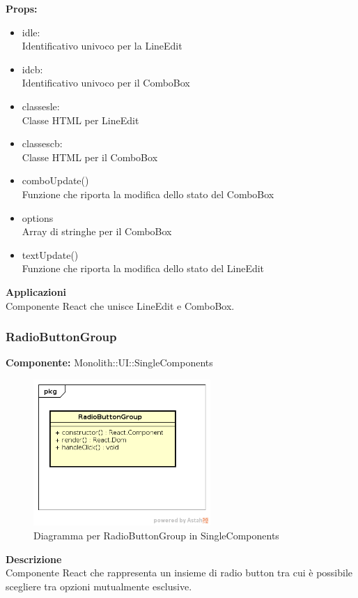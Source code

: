 \textbf{Props:} 
\begin{itemize}
\item idle: 
\\
Identificativo univoco per la LineEdit
\item idcb:
\\
Identificativo univoco per il ComboBox
\item classesle:
\\
Classe HTML per LineEdit
\item classescb: 
\\
Classe HTML per il ComboBox
\item comboUpdate()
\\
Funzione che riporta la modifica dello stato del ComboBox
\item options
\\
Array di stringhe per il ComboBox
\item textUpdate()
\\
Funzione che riporta la modifica dello stato del LineEdit
\end{itemize} 


\textbf{Applicazioni}\\
Componente React che unisce LineEdit e ComboBox.\\ 


\clearpage

\subsubsection{RadioButtonGroup}
\textbf{Componente:}  Monolith::UI::SingleComponents\\
   \FloatBarrier
   \begin{figure}[ht]
   \centering
   \includegraphics[width=0.6\textwidth]{img/single-RadioButtonGroup.png}
   \caption{{Diagramma per RadioButtonGroup in SingleComponents}}
\end{figure}
\FloatBarrier
\textbf{Descrizione}\\
Componente React che rappresenta un insieme di radio button tra cui è possibile scegliere tra opzioni mutualmente esclusive.\\

